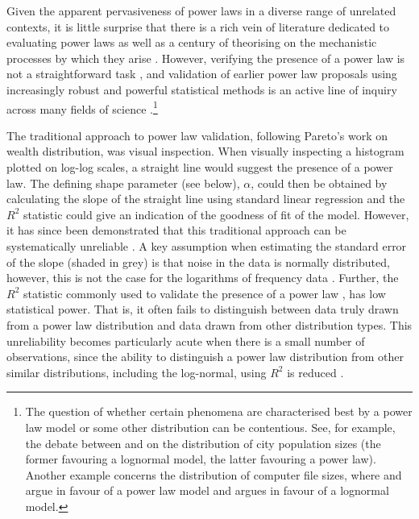 Given the apparent pervasiveness of power laws in a diverse range of unrelated contexts, it is little surprise that there is a rich vein of literature dedicated to evaluating power laws \autocite[p.~662]{clauset_power-law_2009} as well as a century of theorising on the mechanistic processes by which they arise \autocites[see][pp.~336--348]{newman_power_2005}[pp.~230--243]{mitzenmacher_brief_2004}. However, verifying the presence of a power law is not a straightforward task \autocite[p.~666]{stumpf_critical_2012}, and validation of earlier power law proposals using increasingly robust and powerful statistical methods is an active line of inquiry across many fields of science \autocite{malevergne_testing_2011}.\footnote{The question of whether certain phenomena are characterised best by a power law model or some other distribution can be contentious. See, for example, the debate between \textcite{eeckhout_gibrats_2004} and \textcite{levy_gibrats_2009} on the distribution of city population sizes (the former favouring a lognormal model, the latter favouring a power law). Another example concerns the distribution of computer file sizes, where \textcite{barford_generating_1998} and \textcite{barford_changes_1999} argue in favour of a power law model and \textcite{downey_structural_2001} argues in favour of a lognormal model.}

The traditional approach to power law validation, following Pareto's \autocite*{pareto_cours_1897} work on wealth distribution, was visual inspection. When visually inspecting a histogram plotted on log-log scales, a straight line would suggest the presence of a power law. The defining shape parameter (see below), \(\alpha\), could then be obtained by calculating the slope of the straight line using standard linear regression \autocites[p.~665]{clauset_power-law_2009}[p.~254]{urzua_testing_2011} and the \(R^2\) statistic could give an indication of the goodness of fit of the model. However, it has since been demonstrated that this traditional approach can be systematically unreliable \autocite[p.~665]{clauset_power-law_2009}. A key assumption when estimating the standard error of the slope (shaded in grey) is that noise in the data is normally distributed, however, this is not the case for the logarithms of frequency data \autocite[ p.~691]{clauset_power-law_2009}. Further, the \(R^2\) statistic commonly used to validate the presence of a power law \autocite[including by][]{tambovtsev_phoneme_2007}, has low statistical power. That is, it often fails to distinguish between data truly drawn from a power law distribution and data drawn from other distribution types. This unreliability becomes particularly acute when there is a small number of observations, since the ability to distinguish a power law distribution from other similar distributions, including the log-normal, using \(R^2\) is reduced \autocite[p.~691]{clauset_power-law_2009}.

